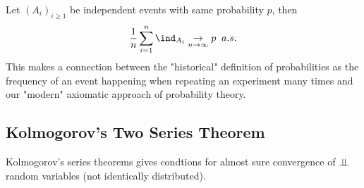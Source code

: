\documentclass[../main.tex]{subfiles}
\begin{document}
  \begin{application}
    Let $(A_i)_{i \geq 1}$ be independent events with same probability $p$, then
    \[
      \frac{1}{n} \sum_{i = 1}^n \ind_{A_i} \underset{n \to \infty}{\to} p \;\;
      a.s.
    \] 
  This makes a connection between the "historical" definition of probabilities
    as the frequency of an event happening when repeating an experiment many
    times and our "modern" axiomatic approach of probability theory.
  \end{application}

  \subsection{Kolmogorov's Two Series Theorem}

  Kolmogorov's series theorems gives condtions for almost sure convergence of
  $\perp\!\!\!\!\,\perp$ random variables (not identically distributed).
\end{document}
